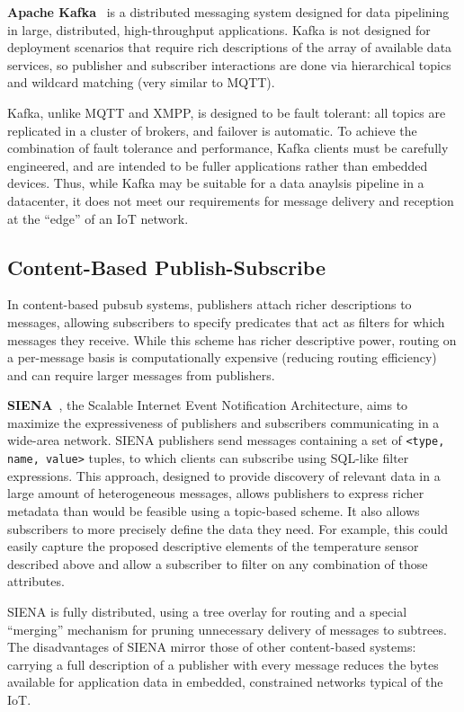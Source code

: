 \textbf{Apache Kafka}~\cite{kreps2011kafka} is a distributed messaging system designed for data pipelining in large, distributed, high-throughput applications.
Kafka is not designed for deployment scenarios that require rich descriptions of the array of available data services, so publisher and subscriber interactions are done via hierarchical topics and wildcard matching (very similar to MQTT).

Kafka, unlike MQTT and XMPP, is designed to be fault tolerant: all topics are replicated in a cluster of brokers, and failover is automatic.
To achieve the combination of fault tolerance and performance, Kafka clients must be carefully engineered, and are intended to be fuller applications rather than embedded devices.
Thus, while Kafka may be suitable for a data anaylsis pipeline in a datacenter, it does not meet our requirements for message delivery and reception at the ``edge'' of an IoT network.

\subsection{Content-Based Publish-Subscribe}

In content-based pubsub systems, publishers attach richer descriptions to messages, allowing subscribers to specify predicates that act as filters for which messages they receive.
While this scheme has richer descriptive power, routing on a per-message basis is computationally expensive (reducing routing efficiency) and can require larger messages from publishers.

\textbf{SIENA}~\cite{carzaniga2000achieving}, the Scalable Internet Event Notification Architecture, aims to maximize the expressiveness of publishers and subscribers communicating in a wide-area network.
SIENA publishers send messages containing a set of \texttt{<type, name, value>} tuples, to which clients can subscribe using SQL-like filter expressions.
This approach, designed to provide discovery of relevant data in a large amount of heterogeneous messages, allows publishers to express richer metadata than would be feasible using a topic-based scheme.
It also allows subscribers to more precisely define the data they need.
For example, this could easily capture the proposed descriptive elements of the temperature sensor described above and allow a subscriber to filter on any combination of those attributes.

SIENA is fully distributed, using a tree overlay for routing and a special ``merging'' mechanism for pruning unnecessary delivery of messages to subtrees.
The disadvantages of SIENA mirror those of other content-based systems: carrying a full description of a publisher with every message reduces the bytes available for application data in embedded, constrained networks typical of the IoT.


